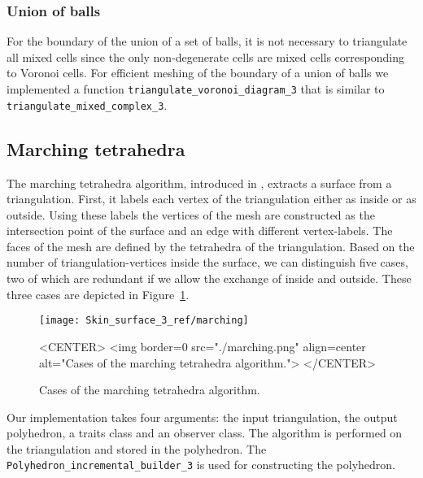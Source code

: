 \subsubsection{Union of balls}
For the boundary of the union of a set of balls, it is not necessary
to triangulate all mixed cells since the only non-degenerate cells are
mixed cells corresponding to Voronoi cells. For efficient meshing of
the boundary of a union of balls we implemented a function
\verb~triangulate_voronoi_diagram_3~ that is similar to
\verb~triangulate_mixed_complex_3~.



\subsection{Marching tetrahedra}
The marching tetrahedra algorithm, introduced in
\cite{treece99regularised}, extracts a surface from a triangulation.
First, it labels each vertex of the triangulation either as inside or
as outside. Using these labels the vertices of the mesh are
constructed as the intersection point of the surface and an edge with
different vertex-labels. The faces of the mesh are defined by the
tetrahedra of the triangulation. Based on the number of
triangulation-vertices inside the surface, we can distinguish five
cases, two of which are redundant if we allow the exchange of inside
and outside. These three cases are depicted in
Figure~\ref{SkinSurface3-fig-marching}.

\begin{figure}
\begin{ccTexOnly}
\begin{center}
\texttt{[image: Skin\_surface\_3\_ref/marching]}
\end{center}
\end{ccTexOnly}
\caption{Cases of the marching tetrahedra algorithm.
\label{SkinSurface3-fig-marching}}
\begin{ccHtmlOnly}
<CENTER>
<img border=0 src="./marching.png" align=center
alt="Cases of the marching tetrahedra algorithm.">
</CENTER>
\end{ccHtmlOnly}
\end{figure}

Our implementation takes four arguments: the input triangulation, the
output polyhedron, a traits class and an observer class.  The
algorithm is performed on the triangulation and stored in the
polyhedron. The \verb~Polyhedron_incremental_builder_3~ is used for
constructing the polyhedron.

